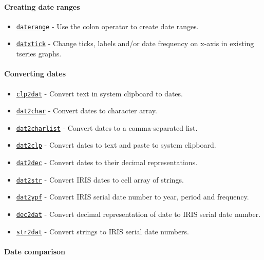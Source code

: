 \paragraph{Creating date ranges}

\begin{itemize}
\itemsep1pt\parskip0pt
\item
  \href{dates/daterange}{\texttt{daterange}} - Use the colon operator to
  create date ranges.
\item
  \href{dates/datxtick}{\texttt{datxtick}} - Change ticks, labels and/or
  date frequency on x-axis in existing tseries graphs.
\end{itemize}

\paragraph{Converting dates}

\begin{itemize}
\itemsep1pt\parskip0pt
\item
  \href{dates/clp2dat}{\texttt{clp2dat}} - Convert text in system
  clipboard to dates.
\item
  \href{dates/dat2char}{\texttt{dat2char}} - Convert dates to character
  array.
\item
  \href{dates/dat2charlist}{\texttt{dat2charlist}} - Convert dates to a
  comma-separated list.
\item
  \href{dates/dat2clp}{\texttt{dat2clp}} - Convert dates to text and
  paste to system clipboard.
\item
  \href{dates/dat2dec}{\texttt{dat2dec}} - Convert dates to their
  decimal representations.
\item
  \href{dates/dat2str}{\texttt{dat2str}} - Convert IRIS dates to cell
  array of strings.
\item
  \href{dates/dat2ypf}{\texttt{dat2ypf}} - Convert IRIS serial date
  number to year, period and frequency.
\item
  \href{dates/dec2dat}{\texttt{dec2dat}} - Convert decimal
  representation of date to IRIS serial date number.
\item
  \href{dates/str2dat}{\texttt{str2dat}} - Convert strings to IRIS
  serial date numbers.
\end{itemize}

\paragraph{Date comparison}


